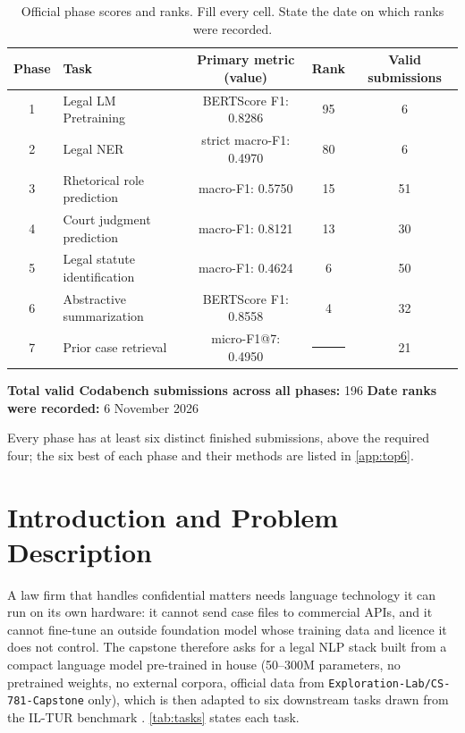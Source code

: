 \documentclass[11pt, oneside]{article}
\newcommand{\fillin}{\rule{1.2cm}{0.4pt}}
\begin{document}
\begin{table}[H]
\centering
\caption{Official phase scores and ranks. Fill every cell. State the date on which ranks were recorded.}
\label{tab:leaderboard}
\small
\begin{tabular}{clccc}
\toprule
Phase & Task & Primary metric (value) & Rank & Valid submissions \\
\midrule
1 & Legal LM Pretraining & BERTScore F1: 0.8286 & 95 & 6 \\
2 & Legal NER & strict macro-F1: 0.4970 & 80 & 6 \\
3 & Rhetorical role prediction & macro-F1: 0.5750 & 15 & 51 \\
4 & Court judgment prediction & macro-F1: 0.8121 & 13 & 30 \\
5 & Legal statute identification & macro-F1: 0.4624 & 6 & 50 \\
6 & Abstractive summarization & BERTScore F1: 0.8558 & 4 & 32 \\
7 & Prior case retrieval & micro-F1@7: 0.4950 & \fillin & 21 \\
\bottomrule
\end{tabular}
\end{table}

\noindent
\textbf{Total valid Codabench submissions across all phases:} 196
\quad
\textbf{Date ranks were recorded:} 6 November 2026

\medskip
\noindent Every phase has at least six distinct finished submissions, above the required four; the six best of
each phase and their methods are listed in \autoref{app:top6}.

\section{Introduction and Problem Description}
A law firm that handles confidential matters needs language technology it can run on its own hardware: it
cannot send case files to commercial APIs, and it cannot fine-tune an outside foundation model whose training
data and licence it does not control.  The capstone therefore asks for a legal NLP stack built from a compact
language model pre-trained in house (50--300M parameters, no pretrained weights, no external corpora, official
data from \texttt{Exploration-Lab/CS-781-Capstone} only), which is then adapted to six downstream tasks drawn
from the IL-TUR benchmark \cite{joshi2024iltur}.  \autoref{tab:tasks} states each task.
\end{document}
